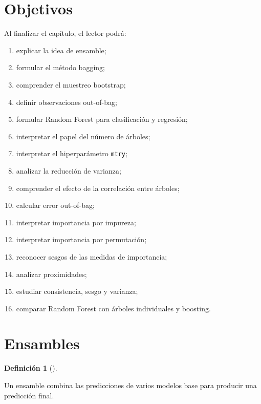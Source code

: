\documentclass[
  spanish,
  10.5pt,
  letterpaper,
  DIV=11,
  numbers=noendperiod,
  oneside,
  open=any]{scrreprt}
\providecommand{\tightlist}{%
  \setlength{\itemsep}{0pt}\setlength{\parskip}{0pt}}
\theoremstyle{definition}
\newtheorem{definition}{Definición}[chapter]
\theoremstyle{definition}
\theoremstyle{plain}
\theoremstyle{remark}
\begin{document}
\section*{Objetivos}\label{objetivos-13}


Al finalizar el capítulo, el lector podrá:

\begin{enumerate}
\def\labelenumi{\arabic{enumi}.}
\tightlist
\item
  explicar la idea de ensamble;
\item
  formular el método bagging;
\item
  comprender el muestreo bootstrap;
\item
  definir observaciones out-of-bag;
\item
  formular Random Forest para clasificación y regresión;
\item
  interpretar el papel del número de árboles;
\item
  interpretar el hiperparámetro \texttt{mtry};
\item
  analizar la reducción de varianza;
\item
  comprender el efecto de la correlación entre árboles;
\item
  calcular error out-of-bag;
\item
  interpretar importancia por impureza;
\item
  interpretar importancia por permutación;
\item
  reconocer sesgos de las medidas de importancia;
\item
  analizar proximidades;
\item
  estudiar consistencia, sesgo y varianza;
\item
  comparar Random Forest con árboles individuales y boosting.
\end{enumerate}

\section*{Ensambles}\label{ensambles}


\begin{definition}[]\protect\hypertarget{def-ensamble}{}\label{def-ensamble}

Un ensamble combina las predicciones de varios modelos base para
producir una predicción final.

\end{definition}
\end{document}
